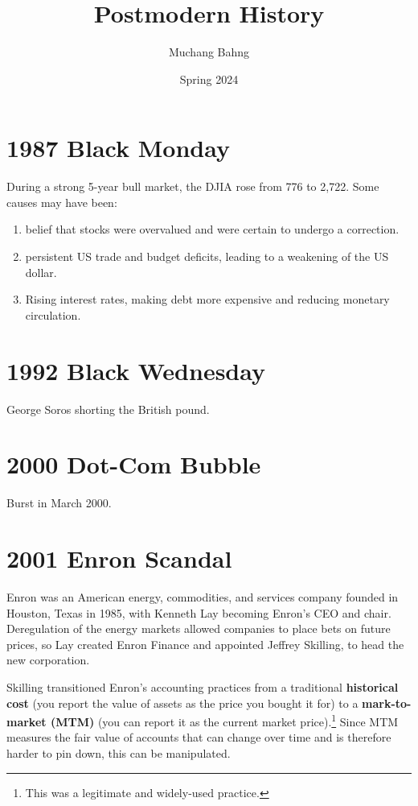 \documentclass{article}
\begin{document}
\title{Postmodern History}
\author{Muchang Bahng}
\date{Spring 2024}

\maketitle
\tableofcontents
\pagebreak


\section{1987 Black Monday}

  During a strong 5-year bull market, the DJIA rose from 776 to 2,722. Some causes may have been:  
  \begin{enumerate}
    \item belief that stocks were overvalued and were certain to undergo a correction. 
    \item persistent US trade and budget deficits, leading to a weakening of the US dollar. 
    \item Rising interest rates, making debt more expensive and reducing monetary circulation. 
  \end{enumerate}

\section{1992 Black Wednesday}

  George Soros shorting the British pound. 

\section{2000 Dot-Com Bubble}

  Burst in March 2000. 

\section{2001 Enron Scandal}

  Enron was an American energy, commodities, and services company founded in Houston, Texas in 1985, with Kenneth Lay becoming Enron's CEO and chair. Deregulation of the energy markets allowed companies to place bets on future prices, so Lay created Enron Finance and appointed Jeffrey Skilling, to head the new corporation. 

  Skilling transitioned Enron's accounting practices from a traditional \textbf{historical cost} (you report the value of assets as the price you bought it for) to a \textbf{mark-to-market (MTM)} (you can report it as the current market price).\footnote{This was a legitimate and widely-used practice.} Since MTM measures the fair value of accounts that can change over time and is therefore harder to pin down, this can be manipulated. 
\end{document}
